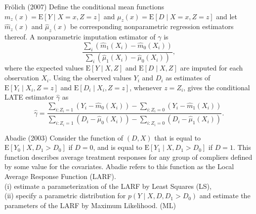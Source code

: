 \documentclass[aspectratio=169,xcolor=dvipsnames]{beamer}
\begin{document}
\begin{frame}{Frölich (2007)}
Define the conditional mean functions $m_{z}(x)=\mathrm{E}[Y \mid X=x, Z=z]$ and $\mu_{z}(x)=\mathrm{E}[D \mid X=x, Z=z]$ and let $\hat{m}_{z}(x)$ and $\hat{\mu}_{z}(x)$ be corresponding nonparametric regression estimators thereof. A nonparametric imputation estimator of $\gamma$ is
$$
\frac{\sum_{i}\left(\hat{m}_{1}\left(X_{i}\right)-\hat{m}_{0}\left(X_{i}\right)\right)}{\sum_{i}\left(\hat{\mu}_{1}\left(X_{i}\right)-\hat{\mu}_{0}\left(X_{i}\right)\right)},
$$
where the expected values $\mathrm{E}[Y \mid X, Z]$ and $\mathrm{E}[D \mid X, Z]$ are imputed for each observation $X_{i}$.
Using the observed values $Y_{i}$ and $D_{i}$ as estimates of $\mathrm{E}\left[Y_{i} \mid X_{i}, Z=z\right]$ and $\mathrm{E}\left[D_{i} \mid X_{i}, Z=z\right]$, whenever $z=Z_{i}$, gives the conditional LATE estimator $\hat{\gamma}$ as
$$
\hat{\gamma}=\frac{\sum_{i: Z_{i}=1}\left(Y_{i}-\hat{m}_{0}\left(X_{i}\right)\right)-\sum_{i: Z_{i}=0}\left(Y_{i}-\hat{m}_{1}\left(X_{i}\right)\right)}{\sum_{i: Z_{i}=1}\left(D_{i}-\hat{\mu}_{0}\left(X_{i}\right)\right)-\sum_{i: Z_{i}=0}\left(D_{i}-\hat{\mu}_{1}\left(X_{i}\right)\right)} .
$$   
\end{frame}

\begin{frame}{Abadie (2003)}
Consider the function of $(D, X)$ that is equal to $\mathrm{E}\left[Y_{0} \mid X, D_{1}>D_{0}\right]$ if $D=0$, and is equal to $\mathrm{E}\left[Y_{1} \mid X, D_{1}>D_{0}\right]$ if $D=1$. This function describes average treatment responses for any group of compliers defined by some value for the covariates. Abadie refers to this function as the Local Average Response Function (LARF). \vspace{8pt}\\
(i) estimate a parameterization of the LARF by Least Squares (LS), \vspace{8pt}\\
(ii) specify a parametric distribution for $p\left(Y \mid X, D, D_{1}>D_{0}\right)$ and estimate the parameters of the LARF by Maximum Likelihood.
(ML)
\end{frame}
\end{document}
